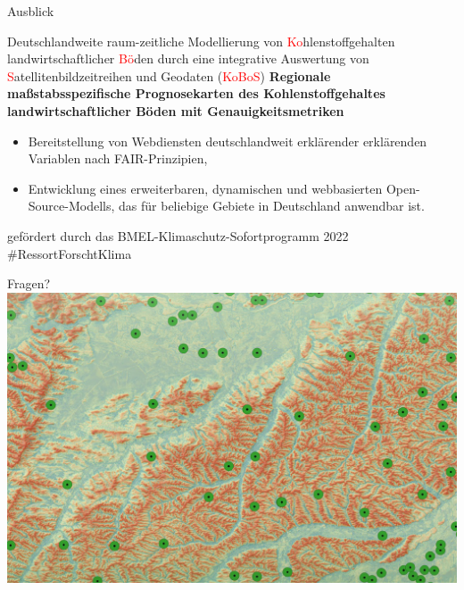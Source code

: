 \begin{frame}{Ausblick}

\begin{block}{Deutschlandweite raum-zeitliche Modellierung von \textcolor{red}{Ko}hlenstoffgehalten
landwirtschaftlicher \textcolor{red}{Bö}den durch eine integrative Auswertung von
\textcolor{red}{S}atellitenbildzeitreihen und Geodaten (\textcolor{red}{KoBoS})}
\textbf{Regionale maßstabsspezifische Prognosekarten des Kohlenstoffgehaltes landwirtschaftlicher Böden mit Genauigkeitsmetriken}
\begin{itemize}
    \item Bereitstellung von Webdiensten deutschlandweit erklärender erklärenden Variablen nach FAIR-Prinzipien,
    \item Entwicklung eines erweiterbaren, dynamischen und webbasierten Open-Source-Modells, das für beliebige Gebiete in Deutschland anwendbar ist.
    \end{itemize}
\end{block}

\footnotesize gefördert durch das BMEL-Klimaschutz-Sofortprogramm 2022 \newline\#RessortForschtKlima

\end{frame}



\begin{frame}{\alert{Fragen?}}
 \centering\includegraphics[width=1\textwidth]{FIGURE/big_cover-remotesensing-v14-i10.png}     
\end{frame}
